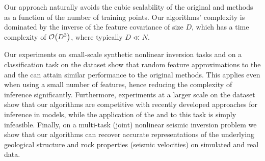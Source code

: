Our approach naturally avoids the cubic scalability of the original \egp and
\ugp methods \citep{steinberg-bonilla-nips-2014} as a function of the number of
training points. Our algorithms' complexity is dominated by the inverse of the
feature covariance of size $D$, which has a time complexity of $\mathcal{O}\!\left({{D^3}}\right)$,
where typically $D \ll N$. 

Our experiments on small-scale synthetic nonlinear inversion tasks and on a
classification task on the \usps dataset show that random feature
approximations to the \egp and the \ugp can attain similar performance to the
original methods. This applies even when using a small number of features,
hence reducing the complexity of inference significantly. Furthermore,
experiments at a larger scale on the \mnist dataset show that our algorithms
are competitive with recently developed approaches for inference in \gp models,
while the application of the \egp and \ugp to this task is simply infeasible.
Finally, on a multi-task (joint) nonlinear seismic inversion  problem we show
that our algorithms can recover accurate representations of the underlying
geological structure and rock properties (seismic velocities) on simulated and
real data.
